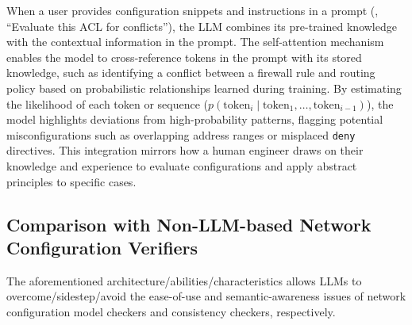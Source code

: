
 When a user provides configuration snippets and instructions in a prompt (\eg, “Evaluate this ACL for conflicts”), the LLM combines its pre-trained knowledge with the contextual information in the prompt. The self-attention mechanism enables the model to cross-reference tokens in the prompt with its stored knowledge, such as identifying a conflict between a firewall rule and routing policy based on probabilistic relationships learned during training. By estimating the likelihood of each token or sequence (\(p(\text{token}_i \mid \text{token}_1, \ldots, \text{token}_{i-1})\)), the model highlights deviations from high-probability patterns, flagging potential misconfigurations such as overlapping address ranges or misplaced \texttt{deny} directives. This integration mirrors how a human engineer draws on their knowledge and experience to evaluate configurations and apply abstract principles to specific cases.

\subsection{Comparison with Non-LLM-based Network Configuration Verifiers}

The aforementioned architecture/abilities/characteristics allows LLMs to overcome/sidestep/avoid the ease-of-use and semantic-awareness issues of network configuration model checkers and consistency checkers, respectively.

